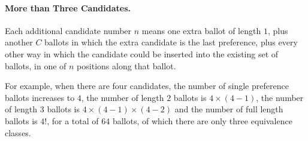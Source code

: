 \documentclass[runningheads,a4paper]{llncs}
\begin{document}
\paragraph{More than Three Candidates.}
Each additional candidate number $n$ means one extra ballot of length
$1$, plus another $C$ ballots in which the extra candidate is the last
preference, plus every other way in which the candidate could be
inserted into the existing set of ballots, in one of $n$ positions
along that ballot.

For example, when there are four candidates, the number of single
preference ballots increases to $4$, the number of length $2$ ballots
is $4 \times (4-1)$, the number of length $3$ ballots is $4 \times
(4-1) \times (4-2)$ and the number of full length ballots is $4!$, for
a total of $64$ ballots, of which there are only three equivalence
classes.
\end{document}

